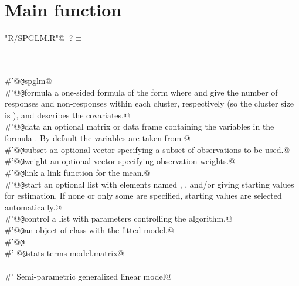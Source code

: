 \documentclass[reqno]{amsart}
\renewcommand{\NWtarget}[2]{\hypertarget{#1}{#2}}
\begin{document}
\section{Main function}

\begin{flushleft} \small\label{scrap1}\raggedright\small
\NWtarget{nuweb?}{} \verb@"R/SPGLM.R"@\nobreak\ {\footnotesize {?}}$\equiv$
\vspace{-1ex}
\begin{list}{}{} \item
\mbox{}\verb@@\\
\mbox{}\verb@@\\
\mbox{}\verb@#'@{\tt @}\verb@rdname spglm@\\
\mbox{}\verb@#'@{\tt @}\verb@param formula a one-sided formula of the form  where  and  give the number of responses and non-responses within each cluster, respectively (so the cluster size is ), and  describes the covariates.@\\
\mbox{}\verb@#'@{\tt @}\verb@param data  an optional matrix or data frame containing the variables in the formula . By default the variables are taken from @\\
\mbox{}\verb@#'@{\tt @}\verb@param subset  an optional vector specifying a subset of observations to be used.@\\
\mbox{}\verb@#'@{\tt @}\verb@param weight  an optional vector specifying observation weights.@\\
\mbox{}\verb@#'@{\tt @}\verb@param link      a link function for the mean.@\\
\mbox{}\verb@#'@{\tt @}\verb@param start     an optional list with elements named , , and/or  giving starting values for estimation. If none or only some are specified, starting values are selected automatically.@\\
\mbox{}\verb@#'@{\tt @}\verb@param control a list with parameters controlling the algorithm.@\\
\mbox{}\verb@#'@{\tt @}\verb@return an object of class  with the fitted model.@\\
\mbox{}\verb@#'@{\tt @}\verb@export@\\
\mbox{}\verb@#' @{\tt @}\verb@importFrom stats terms model.matrix@\\
\mbox{}\verb@@\\
\mbox{}\verb@#' Semi-parametric generalized linear model@\\

\end{list}
\end{flushleft}
\end{document}

